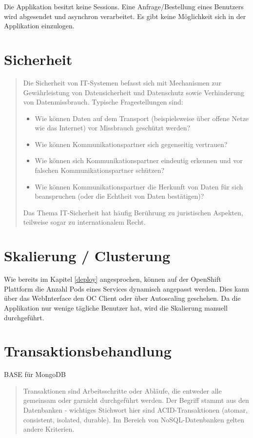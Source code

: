 Die Applikation besitzt keine Sessions. Eine Anfrage/Bestellung eines Benutzers wird abgesendet und asynchron verarbeitet. Es gibt keine Möglichkeit sich in der Applikation einzulogen.

\section{Sicherheit}

\begin{quote}
	Die Sicherheit von IT-Systemen befasst sich mit Mechanismen zur Gewährleistung von Datensicherheit und Datenschutz sowie Verhinderung von Datenmissbrauch.
	Typische Fragestellungen sind:
	\begin{itemize}
		\item Wie können Daten auf dem Transport (beispielsweise über offene Netze wie das Internet) vor Missbrauch geschützt werden?
		\item Wie können Kommunikationspartner sich gegenseitig vertrauen?
		\item Wie können sich Kommunikationspartner eindeutig erkennen und vor falschen Kommunikationspartner schützen?
		\item Wie können Kommunikationspartner die Herkunft von Daten für sich beanspruchen (oder die Echtheit von Daten bestätigen)?
	\end{itemize}
	Das Thema IT-Sicherheit hat häufig Berührung zu juristischen Aspekten, teilweise sogar zu internationalem Recht.
\end{quote}

\section{Skalierung / Clusterung}

Wie bereits im Kapitel \ref{deploy} angesprochen, können auf der OpenShift Plattform die Anzahl Pods eines Services dynamisch angepasst werden. Dies kann über das WebInterface den OC Client oder über Autoscaling geschehen. Da die Applikation nur wenige tägliche Benutzer hat, wird die Skalierung manuell durchgeführt.

\section{Transaktionsbehandlung}

BASE für MongoDB

\begin{quote}
	Transaktionen sind Arbeitsschritte oder Abläufe, die entweder alle gemeinsam oder garnicht durchgeführt werden. Der Begriff stammt aus den Datenbanken - wichtiges Stichwort hier sind ACID-Transaktionen (atomar, consistent, isolated, durable). Im Bereich von NoSQL-Datenbanken gelten andere Kriterien.
\end{quote}


